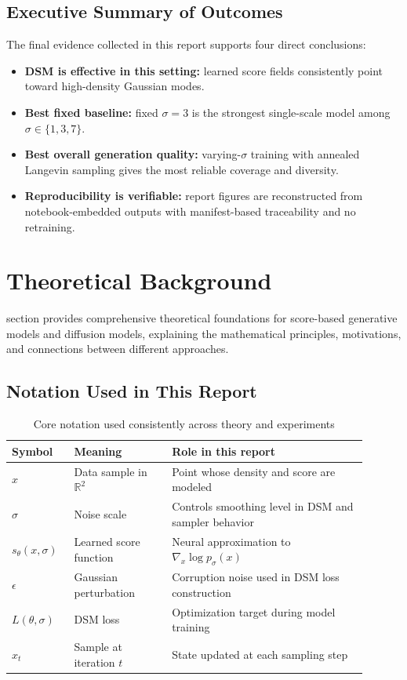 \documentclass[journal]{IEEEtran}
\begin{document}
\subsection{Executive Summary of Outcomes}

The final evidence collected in this report supports four direct conclusions:
\begin{itemize}
    \item \textbf{DSM is effective in this setting:} learned score fields consistently point toward high-density Gaussian modes.
    \item \textbf{Best fixed baseline:} fixed $\sigma = 3$ is the strongest single-scale model among $\sigma \in \{1,3,7\}$.
    \item \textbf{Best overall generation quality:} varying-$\sigma$ training with annealed Langevin sampling gives the most reliable coverage and diversity.
    \item \textbf{Reproducibility is verifiable:} report figures are reconstructed from notebook-embedded outputs with manifest-based traceability and no retraining.
\end{itemize}

\section{Theoretical Background}
 section provides comprehensive theoretical foundations for score-based generative models and diffusion models, explaining the mathematical principles, motivations, and connections between different approaches.

\subsection{Notation Used in This Report}

\begin{table}[H]
\centering
\footnotesize
\setlength{\tabcolsep}{4pt}
\begin{tabular}{p{0.15\linewidth}p{0.25\linewidth}p{0.50\linewidth}}
\toprule
Symbol & Meaning & Role in this report \\
\midrule
$x$ & Data sample in $\mathbb{R}^2$ & Point whose density and score are modeled \\
\midrule
$\sigma$ & Noise scale & Controls smoothing level in DSM and sampler behavior \\
\midrule
$s_\theta(x,\sigma)$ & Learned score function & Neural approximation to $\nabla_x \log p_\sigma(x)$ \\
\midrule
$\epsilon$ & Gaussian perturbation & Corruption noise used in DSM loss construction \\
\midrule
$L(\theta,\sigma)$ & DSM loss & Optimization target during model training \\
\midrule
$x_t$ & Sample at iteration $t$ & State updated at each sampling step \\
\bottomrule
\end{tabular}
\normalsize
\caption{Core notation used consistently across theory and experiments}
\label{tab:notation}
\end{table}
\end{document}
